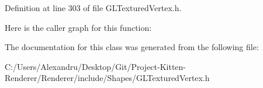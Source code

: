 Definition at line 303 of file G\+L\+Textured\+Vertex.\+h.



Here is the caller graph for this function\+:




The documentation for this class was generated from the following file\+:\begin{DoxyCompactItemize}
\item 
C\+:/\+Users/\+Alexandru/\+Desktop/\+Git/\+Project-\/\+Kitten-\/\+Renderer/\+Renderer/include/\+Shapes/G\+L\+Textured\+Vertex.\+h\end{DoxyCompactItemize}
